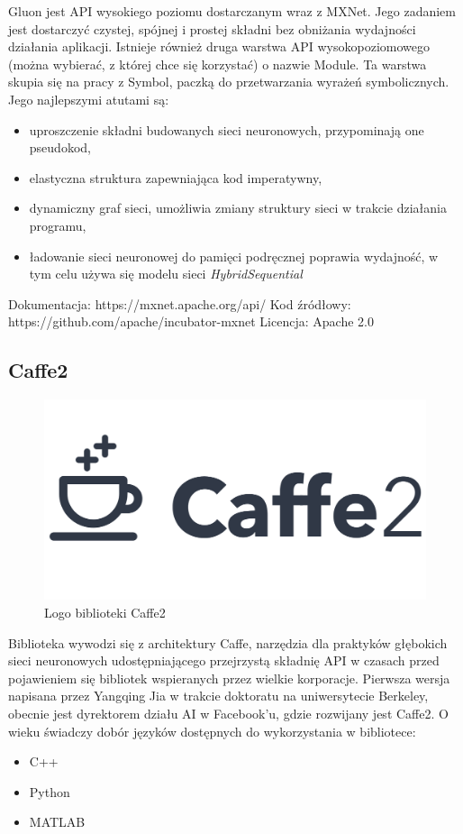 \documentclass[12pt,a4paper,twoside,titlepage,openright]{book}
\begin{document}
Gluon jest API wysokiego poziomu dostarczanym wraz z MXNet. Jego zadaniem jest dostarczyć czystej, spójnej i prostej składni bez obniżania wydajności działania aplikacji. Istnieje również druga warstwa API wysokopoziomowego (można wybierać, z której chce się korzystać) o nazwie Module. Ta warstwa skupia się na pracy z Symbol, paczką do przetwarzania wyrażeń symbolicznych. \cite{DBLP:journals/corr/ChenLLLWWXXZZ15} Jego najlepszymi atutami są:
\begin{itemize}
\item uproszczenie składni budowanych sieci neuronowych, przypominają one pseudokod,
\item elastyczna struktura zapewniająca kod imperatywny,
\item dynamiczny graf sieci, umożliwia zmiany struktury sieci w trakcie działania programu,
\item ładowanie sieci neuronowej do pamięci podręcznej poprawia wydajność, w tym celu używa się modelu sieci \textit{HybridSequential}
\end{itemize}

\noindent 
\newline
Dokumentacja: https://mxnet.apache.org/api/
\newline
Kod źródłowy: https://github.com/apache/incubator-mxnet
\newline
Licencja: Apache 2.0

\subsection{Caffe2}
\begin{figure}[h]
	\centering
			\includegraphics[resolution=100, scale=0.35]{Caffe2.png}
		\caption{Logo biblioteki Caffe2}
\end{figure}

Biblioteka wywodzi się z architektury Caffe, narzędzia dla praktyków głębokich sieci neuronowych udostępniającego przejrzystą składnię API w czasach przed pojawieniem się bibliotek wspieranych przez wielkie korporacje. Pierwsza wersja napisana przez Yangqing Jia w trakcie doktoratu na uniwersytecie Berkeley, obecnie jest dyrektorem działu AI w Facebook'u, gdzie rozwijany jest Caffe2. \cite{jia2014caffe} O wieku świadczy dobór języków dostępnych do wykorzystania w bibliotece:
\begin{itemize}
\item C++
\item Python
\item MATLAB
\end{itemize}
\end{document}
